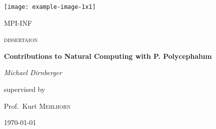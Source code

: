 
\begin{titlepage}
	\centering
	\texttt{[image: example-image-1x1]}\par\vspace{1cm}
	{\scshape\LARGE MPI-INF \par}
	\vspace{1cm}
	{\scshape\Large dissertaion\par}
	\vspace{1.5cm}
	{\huge\bfseries Contributions to Natural Computing with P. Polycephalum\par}
	\vspace{2cm}
	{\Large\itshape Michael Dirnberger\par}
	\vfill
	supervised by\par
	Prof.~Kurt \textsc{Mehlhorn}

	\vfill

	{\large \today\par}
\end{titlepage}